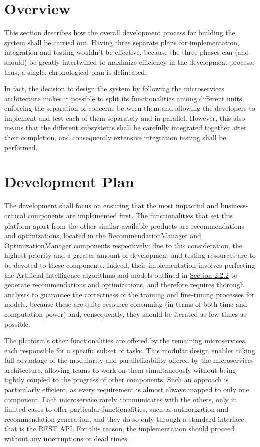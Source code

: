 \section{Overview}
\label{sec: overview}

This section describes how the overall development process for building the system shall be carried out. Having three separate plans for implementation, integration and testing wouldn't be effective, because the three phases can (and should) be greatly intertwined to maximize efficiency in the development process: thus, a single, chronological plan is delineated. 

In fact, the decision to design the system by following the microservices architecture makes it possible to split its functionalities among different units, enforcing the separation of concerns between them and allowing the developers to implement and test each of them separately and in parallel. However, this also means that the different subsystems shall be carefully integrated together after their completion, and consequently extensive integration testing shall be performed.

\section{Development Plan}
\label{sec: development}

The development shall focus on ensuring that the most impactful and business-critical components are implemented first. The functionalities that set this platform apart from the other similar available products are recommendations and optimizations, located in the RecommendationManager and OptimizationManager components respectively: due to this consideration, the highest priority and a greater amount of development and testing resources are to be devoted to these components. Indeed, their implementation involves perfecting the Artificial Intelligence algorithms and models outlined in \hyperref[subsec:components_description]{\protect\uline{Section 2.2.2}} to generate recommendations and optimizations, and therefore requires thorough analyses to guarantee the correctness of the training and fine-tuning processes for models, because these are quite resource-consuming (in terms of both time and computation power) and, consequently, they should be iterated as few times as possible.

The platform's other functionalities are offered by the remaining microservices, each responsible for a specific subset of tasks. This modular design enables taking full advantage of the modularity and parallelizability offered by the microservices architecture, allowing teams to work on them simultaneously without being tightly coupled to the progress of other components. Such an approach is particularly efficient, as every requirement is almost always mapped to only one component.
Each microservice rarely communicates with the others, only in limited cases to offer particular functionalities, such as authorization and recommendation generation, and they do so only through a standard interface that is the REST API.
For this reason, the implementation should proceed without any interruptions or dead times.


